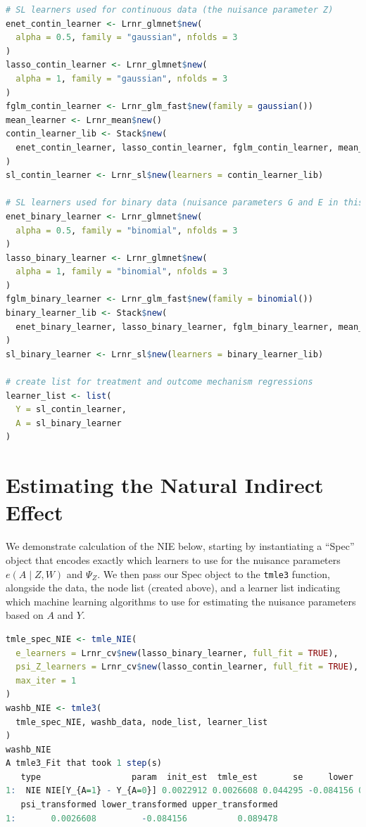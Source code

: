 \documentclass[
  12pt, krantz2,
]{krantz}
\newcommand{\passthrough}[1]{#1}
\theoremstyle{definition}
\theoremstyle{definition}
\theoremstyle{definition}
\newcommand{\1}{\mathbbm{1}}
\begin{document}
\begin{lstlisting}[language=R]
# SL learners used for continuous data (the nuisance parameter Z)
enet_contin_learner <- Lrnr_glmnet$new(
  alpha = 0.5, family = "gaussian", nfolds = 3
)
lasso_contin_learner <- Lrnr_glmnet$new(
  alpha = 1, family = "gaussian", nfolds = 3
)
fglm_contin_learner <- Lrnr_glm_fast$new(family = gaussian())
mean_learner <- Lrnr_mean$new()
contin_learner_lib <- Stack$new(
  enet_contin_learner, lasso_contin_learner, fglm_contin_learner, mean_learner
)
sl_contin_learner <- Lrnr_sl$new(learners = contin_learner_lib)

# SL learners used for binary data (nuisance parameters G and E in this case)
enet_binary_learner <- Lrnr_glmnet$new(
  alpha = 0.5, family = "binomial", nfolds = 3
)
lasso_binary_learner <- Lrnr_glmnet$new(
  alpha = 1, family = "binomial", nfolds = 3
)
fglm_binary_learner <- Lrnr_glm_fast$new(family = binomial())
binary_learner_lib <- Stack$new(
  enet_binary_learner, lasso_binary_learner, fglm_binary_learner, mean_learner
)
sl_binary_learner <- Lrnr_sl$new(learners = binary_learner_lib)

# create list for treatment and outcome mechanism regressions
learner_list <- list(
  Y = sl_contin_learner,
  A = sl_binary_learner
)
\end{lstlisting}

\hypertarget{estimating-the-natural-indirect-effect}{%
\section{Estimating the Natural Indirect Effect}\label{estimating-the-natural-indirect-effect}}

We demonstrate calculation of the NIE below, starting by instantiating a ``Spec''
object that encodes exactly which learners to use for the nuisance parameters
\(e(A \mid Z, W)\) and \(\Psi_Z\). We then pass our Spec object to the \passthrough{\lstinline!tmle3!}
function, alongside the data, the node list (created above), and a learner list
indicating which machine learning algorithms to use for estimating the nuisance
parameters based on \(A\) and \(Y\).

\begin{lstlisting}[language=R]
tmle_spec_NIE <- tmle_NIE(
  e_learners = Lrnr_cv$new(lasso_binary_learner, full_fit = TRUE),
  psi_Z_learners = Lrnr_cv$new(lasso_contin_learner, full_fit = TRUE),
  max_iter = 1
)
washb_NIE <- tmle3(
  tmle_spec_NIE, washb_data, node_list, learner_list
)
washb_NIE
A tmle3_Fit that took 1 step(s)
   type                  param  init_est  tmle_est       se     lower    upper
1:  NIE NIE[Y_{A=1} - Y_{A=0}] 0.0022912 0.0026608 0.044295 -0.084156 0.089478
   psi_transformed lower_transformed upper_transformed
1:       0.0026608         -0.084156          0.089478
\end{lstlisting}
\end{document}
